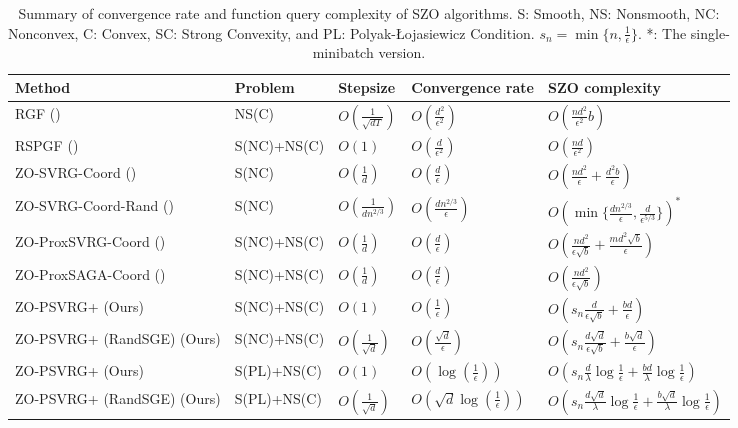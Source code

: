 \begin{table*}[t]
\begin{center}
\begin{tabular}{ |l|l|l|l|l| } 
 \hline
 Method & Problem & Stepsize& Convergence rate & SZO complexity\\ 
 \hline
  
 RGF (\cite{nesterov2017random}) & NS(C) & $O\left(\frac{1}{\sqrt{dT}}\right)$ & $O\left(\frac{d^2}{\epsilon^2}\right)$ &$O\left(\frac{nd^2}{\epsilon^2}b\right)$\\
 RSPGF (\cite{ghadimi2016accelerated}) & S(NC)+NS(C) & $O\left(1\right)$ & $O\left(\frac{d}{\epsilon^2}\right)$ &$O\left(\frac{nd}{\epsilon^2}\right)$\\ 
 ZO-SVRG-Coord (\cite{liu2018zeroth}) & S(NC)& $O\left(\frac{1}{{d}}\right)$ & $O\left(\frac{d}{\epsilon}\right)$ & $O(\frac{nd^2}{\epsilon}+\frac{d^2b}{\epsilon})$\\
 ZO-SVRG-Coord-Rand (\cite{ji2019improved}) & S(NC)& $O\left(\frac{1}{{dn^{2/3}}}\right)$ & $O\left(\frac{dn^{2/3}}{\epsilon}\right)$ & $O(\min\{\frac{dn^{2/3}}{\epsilon},\frac{d}{\epsilon^{5/3}}\})^{*}$\\
  ZO-ProxSVRG-Coord (\cite{gu2018faster}) & S(NC)+NS(C) & $O\left(\frac{1}{{d}}\right)$ & $O\left(\frac{d}{\epsilon}\right)$ & $O(\frac{nd^2}{\epsilon\sqrt{b}}+\frac{md^2\sqrt{b}}{\epsilon})$\\
   ZO-ProxSAGA-Coord (\cite{gu2018faster}) & S(NC)+NS(C)& $O\left(\frac{1}{{d}}\right)$ & $O\left(\frac{d}{\epsilon}\right)$ & $O(\frac{nd^2}{\epsilon\sqrt{b}})$\\
   ZO-PSVRG+ (Ours)  & S(NC)+NS(C) & $O\left(1\right)$ & $O\left(\frac{1}{\epsilon}\right)$ & $O\left(s_n\frac{d}{\epsilon \sqrt{b}}+\frac{bd}{\epsilon}\right)$\\
   ZO-PSVRG+ (RandSGE) (Ours)  & S(NC)+NS(C) & $O\left(\frac{1}{\sqrt{d}}\right)$ & $O\left(\frac{\sqrt{d}}{\epsilon}\right)$ & $O\left(s_n\frac{d\sqrt{d}}{\epsilon \sqrt{b}}+\frac{b\sqrt{d}}{\epsilon}\right)$\\
   ZO-PSVRG+ (Ours) & S(PL)+NS(C) & $O\left(1\right)$ & $O\left(\log(\frac{1}{\epsilon})\right)$ & {\scriptsize$O(s_n \frac{d}{\lambda}\log\frac{1}{\epsilon}+\frac{bd}{\lambda}\log\frac{1}{\epsilon})$}\\
   ZO-PSVRG+ (RandSGE) (Ours) & S(PL)+NS(C) & $O\left(\frac{1}{\sqrt{d}}\right)$ & $O\left(\sqrt{d}\log(\frac{1}{\epsilon})\right)$ & {\scriptsize$O(s_n\frac{d\sqrt{d}}{\lambda}\log\frac{1}{\epsilon}+\frac{b\sqrt{d}}{\lambda}\log\frac{1}{\epsilon})$}\\
 \hline
\end{tabular}
\caption{Summary of convergence rate and function query complexity of SZO algorithms. S: Smooth, NS: Nonsmooth, NC: Nonconvex, C: Convex, SC: Strong Convexity, and PL: Polyak-Łojasiewicz Condition. $s_n = \min\{n, \frac{1}{\epsilon}\}$. *: The single-minibatch version.}
\label{table-compare}
\end{center}
\end{table*}

